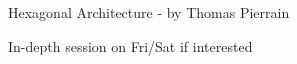 \begin{frame}[fragile]{\de{}}

{\large
Hexagonal Architecture - by Thomas Pierrain
}


{\large
In-depth session on Fri/Sat if interested 
}

\end{frame}




%
%
%
%
%
